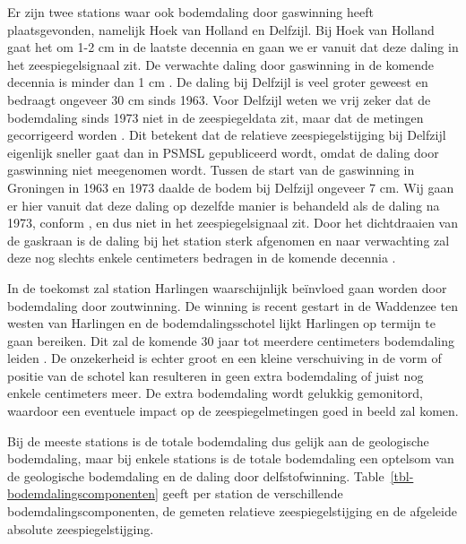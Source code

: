 \documentclass[ddraft]{deltares_report}
\begin{document}
Er zijn twee stations waar ook bodemdaling door gaswinning heeft
plaatsgevonden, namelijk Hoek van Holland en Delfzijl. Bij Hoek van
Holland gaat het om 1-2 cm in de laatste decennia en gaan we er vanuit
dat deze daling in het zeespiegelsignaal zit. De verwachte daling door
gaswinning in de komende decennia is minder dan 1 cm \citep{Hijma2026}.
De daling bij Delfzijl is veel groter geweest en bedraagt ongeveer 30 cm
sinds 1963. Voor Delfzijl weten we vrij zeker dat de bodemdaling sinds
1973 niet in de zeespiegeldata zit, maar dat de metingen gecorrigeerd
worden \citep[punt 5]{Jong1973}. Dit betekent dat de relatieve
zeespiegelstijging bij Delfzijl eigenlijk sneller gaat dan in PSMSL
gepubliceerd wordt, omdat de daling door gaswinning niet meegenomen
wordt. Tussen de start van de gaswinning in Groningen in 1963 en 1973
daalde de bodem bij Delfzijl ongeveer 7 cm. Wij gaan er hier vanuit dat
deze daling op dezelfde manier is behandeld als de daling na 1973,
conform \citep[punt 5]{Jong1973}, en dus niet in het zeespiegelsignaal
zit. Door het dichtdraaien van de gaskraan is de daling bij het station
sterk afgenomen en naar verwachting zal deze nog slechts enkele
centimeters bedragen in de komende decennia \citep{Hijma2026}.

In de toekomst zal station Harlingen waarschijnlijk beïnvloed gaan
worden door bodemdaling door zoutwinning. De winning is recent gestart
in de Waddenzee ten westen van Harlingen en de bodemdalingsschotel lijkt
Harlingen op termijn te gaan bereiken. Dit zal de komende 30 jaar tot
meerdere centimeters bodemdaling leiden \citep{Hijma2025c, Hijma2026}.
De onzekerheid is echter groot en een kleine verschuiving in de vorm of
positie van de schotel kan resulteren in geen extra bodemdaling of juist
nog enkele centimeters meer. De extra bodemdaling wordt gelukkig
gemonitord, waardoor een eventuele impact op de zeespiegelmetingen goed
in beeld zal komen.

Bij de meeste stations is de totale bodemdaling dus gelijk aan de
geologische bodemdaling, maar bij enkele stations is de totale
bodemdaling een optelsom van de geologische bodemdaling en de daling
door delfstofwinning. Table~\ref{tbl-bodemdalingscomponenten} geeft per
station de verschillende bodemdalingscomponenten, de gemeten relatieve
zeespiegelstijging en de afgeleide absolute zeespiegelstijging.
\end{document}
